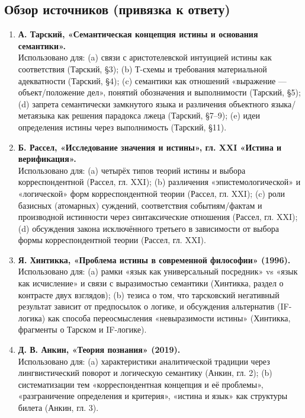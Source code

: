 \documentclass[a4paper,12pt]{article}
\begin{document}
\subsection{Обзор источников (привязка к ответу)}
\begin{enumerate}
  \item \textbf{А. Тарский, «Семантическая концепция истины и основания семантики».}\\
  Использовано для: (a) связи с аристотелевской интуицией истины как соответствия (Тарский, \S 3); (b) Т-схемы и требования материальной адекватности (Тарский, \S 4); (c) семантики как отношений «выражение — объект/положение дел», понятий обозначения и выполнимости (Тарский, \S 5); (d) запрета семантически замкнутого языка и различения объектного языка/метаязыка как решения парадокса лжеца (Тарский, \S 7–9); (e) идеи определения истины через выполнимость (Тарский, \S 11).
  \item \textbf{Б. Рассел, «Исследование значения и истины», гл. XXI «Истина и верификация».}\\
  Использовано для: (a) четырёх типов теорий истины и выбора корреспондентной (Рассел, гл. XXI); (b) различения «эпистемологической» и «логической» форм корреспондентной теории (Рассел, гл. XXI); (c) роли базисных (атомарных) суждений, соответствия событиям/фактам и производной истинности через синтаксические отношения (Рассел, гл. XXI); (d) обсуждения закона исключённого третьего в зависимости от выбора формы корреспондентной теории (Рассел, гл. XXI).
  \item \textbf{Я. Хинтикка, «Проблема истины в современной философии» (1996).}\\
  Использовано для: (a) рамки «язык как универсальный посредник» vs «язык как исчисление» и связи с выразимостью семантики (Хинтикка, раздел о контрасте двух взглядов); (b) тезиса о том, что тарсковский негативный результат зависит от предпосылок о логике, и обсуждения альтернатив (IF-логика) как способа переосмысления «невыразимости истины» (Хинтикка, фрагменты о Тарском и IF-логике).
  \item \textbf{Д. В. Анкин, «Теория познания» (2019).}\\
  Использовано для: (a) характеристики аналитической традиции через лингвистический поворот и логическую семантику (Анкин, гл. 2); (b) систематизации тем «корреспондентная концепция и её проблемы», «разграничение определения и критерия», «истина и язык» как структуры билета (Анкин, гл. 3).
\end{enumerate}
\end{document}
